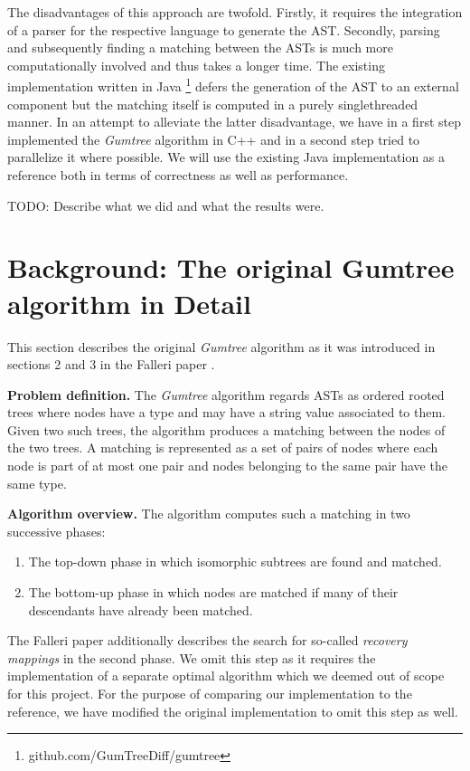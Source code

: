 \documentclass[letterpaper]{article}
\newcommand{\mypar}[1]{{\bf #1.}}
\begin{document}
The disadvantages of this approach are twofold.
Firstly, it requires the integration of a parser for the respective language to generate the AST.
Secondly, parsing and subsequently finding a matching between the ASTs is much more computationally involved and thus takes a longer time.
The existing implementation written in Java \footnote{github.com/GumTreeDiff/gumtree} defers the generation of the AST to an external component but the matching itself is computed in a purely singlethreaded manner.
In an attempt to alleviate the latter disadvantage, we have in a first step implemented the \emph{Gumtree} algorithm in C++ and in a second step tried to parallelize it where possible.
We will use the existing Java implementation as a reference both in terms of correctness as well as performance.

TODO: Describe what we did and what the results were.

\section{Background: The original Gumtree algorithm in Detail}\label{sec:background}

This section describes the original \emph{Gumtree} algorithm as it was introduced in sections 2 and 3 in the Falleri paper \cite{falleri:2014:structure_diff}.

\mypar{Problem definition}
The \emph{Gumtree} algorithm regards ASTs as ordered rooted trees where nodes have a type and may have a string value associated to them.
Given two such trees, the algorithm produces a matching between the nodes of the two trees.
A matching is represented as a set of pairs of nodes where each node is part of at most one pair and nodes belonging to the same pair have the same type.

\mypar{Algorithm overview}
The algorithm computes such a matching in two successive phases:
\begin{enumerate}
	\item The top-down phase in which isomorphic subtrees are found and matched.
	\item The bottom-up phase in which nodes are matched if many of their descendants have already been matched.
\end{enumerate}
The Falleri paper additionally describes the search for so-called \emph{recovery mappings} in the second phase.
We omit this step as it requires the implementation of a separate optimal algorithm which we deemed out of scope for this project.
For the purpose of comparing our implementation to the reference, we have modified the original implementation to omit this step as well.
\end{document}
